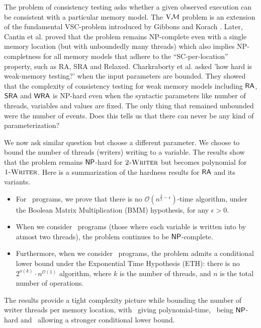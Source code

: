 
The problem of consistency testing asks whether a given observed execution can be consistent with a particular memory model. The $\mathrm{V}\mathcal{M}$ problem is an extension of the fundamental VSC-problem introduced by Gibbons and Korach  \cite{gibbons}. Later, Cantin et al.\cite{CantinLS05} proved that the problem remains NP-complete even with a single memory
location (but with unboundedly many threads) which also implies NP-completness for all memory
models that adhere to the “SC-per-location” property, such as  RA, SRA and Relaxed.  Charkraborty et al. \cite{ChakrabortyKMP24} asked 'how hard is weak-memory testing?' when the input parameters are bounded. They showed that the complexity of consistency testing for weak memory models including $\mathsf{RA}$, $\mathsf{SRA}$ and $\mathsf{WRA}$ is NP-hard even when the syntactic parameters like number of threads, variables and values are fixed. The only thing that remained unbounded were the number of events. Does this tells us that there can never be any kind of parameterization?

We now ask similar question but choose a different parameter. We choose to bound the number of threads (writers) writing to a variable. The results show that the problem remains $\mathsf{NP}$-hard for $\textsc{2-Writer}$ but becomes  polynomial for $\textsc{1-Writer}$.  Here is a summarization of the  hardness results for $\mathsf{RA}$ and its variants.

\begin{itemize}
\item For \onewriter\ programs, we prove that there is no $\mathcal{O}(n^{\frac{3}{2} - \epsilon})$-time algorithm, under the Boolean Matrix Multiplication (BMM) hypothesis, for any $\epsilon > 0$. 
\item When we consider \twowriter\ programs (those where each variable is written into by atmost two threads), the problem continues to be $\mathsf{NP}$-complete. 
\item Furthermore, when we consider \threewriter\ programs, the problem admits a conditional lower bound under the Exponential Time Hypothesis (ETH): there is no $2^{o(k)} \cdot n^{\mathcal{O}(1)}$ algorithm, where $k$ is the number of threads, and $n$ is the total number of operations.
\end{itemize}
The results provide a tight complexity picture while bounding the number of writer threads per memory location, with \onewriter\ giving polynomial-time, \twowriter\ being $\mathsf{NP}$-hard and \threewriter\ allowing a stronger conditional lower bound. 



